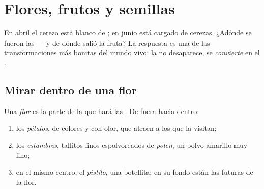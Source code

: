 \chapter{Flores, frutos y semillas}\label{ch:g3:flowers-fruits-seeds}

En abril el cerezo está blanco de ; en junio está cargado de
cerezas. ¿Adónde se fueron las  --- y de dónde salió la fruta?
La respuesta es una de las transformaciones más bonitas del mundo
vivo: la  no desaparece, se \emph{convierte} en el .

\section{Mirar dentro de una flor}

\begin{definition}\label{def:g3:flowers-fruits-seeds:parts}
Una \emph{flor} es la parte de la  que hará las
. De fuera hacia dentro:
\begin{enumerate}
  \item los \emph{pétalos}, de colores y con olor, que
        atraen a los  que la visitan;
  \item los \emph{estambres}, tallitos finos
        espolvoreados de \emph{polen}, un polvo amarillo
        muy fino;
  \item en el mismo centro, el \emph{pistilo}, una
        botellita; en su fondo están las futuras  de la flor.
\end{enumerate}
\end{definition}

